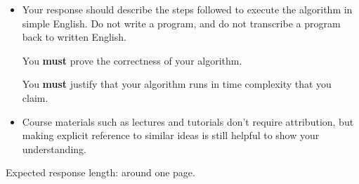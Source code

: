 \documentclass[12pt]{article}
\begin{document}
\begin{rubric}
\begin{itemize}
    \item Your response should describe the steps followed to execute the algorithm in simple English. Do not write a program, and do not transcribe a program back to written English.
    
    You \textbf{must} prove the correctness of your algorithm.
    
    You \textbf{must} justify that your algorithm runs in time complexity that you claim.

    \item Course materials such as lectures and tutorials don't require attribution, but making explicit reference to similar ideas is still helpful to show your understanding.
\end{itemize}
Expected response length: around one page.
\end{rubric}

\begin{solution}
\end{solution}

\begin{attribution}
\end{attribution}
\end{document}

